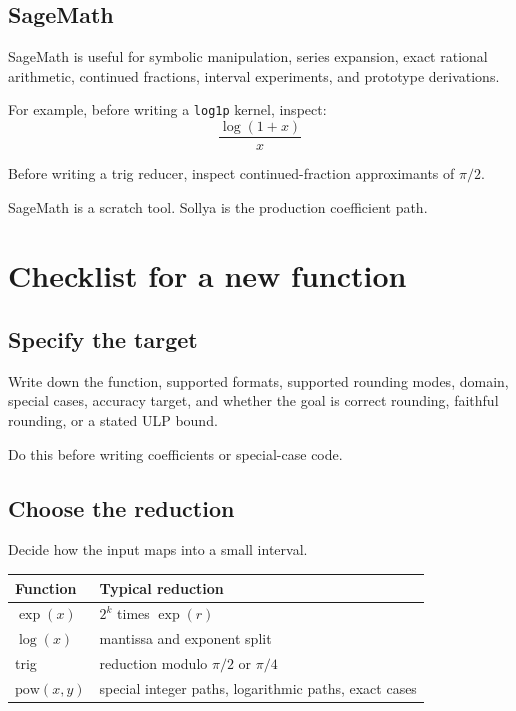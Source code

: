 \documentclass[manuscript, nonacm]{acmart}
\begin{document}
  \subsection{SageMath}

  SageMath is useful for symbolic manipulation, series expansion, exact rational
  arithmetic, continued fractions, interval experiments, and prototype
  derivations.

  For example, before writing a \texttt{log1p} kernel, inspect:
  \[ \frac{\log(1+x)}{x} \]

  Before writing a trig reducer, inspect continued-fraction approximants of
  $\pi/2$.

  SageMath is a scratch tool. Sollya is the production coefficient path.



  \section{Checklist for a new function}

  \subsection{Specify the target}

  Write down the function, supported formats, supported rounding modes, domain,
  special cases, accuracy target, and whether the goal is correct rounding,
  faithful rounding, or a stated ULP bound.

  Do this before writing coefficients or special-case code.

  \subsection{Choose the reduction}

  Decide how the input maps into a small interval.

  \begin{table}[tbp]
    \centering
    \begin{tabular}{ll}
      \toprule
      Function            & Typical reduction                                     \\
      \midrule
      $\exp(x)$           & $2^k$ times $\exp(r)$                                 \\
      $\log(x)$           & mantissa and exponent split                           \\
      trig                & reduction modulo $\pi/2$ or $\pi/4$                   \\
      $\mathrm{pow}(x,y)$ & special integer paths, logarithmic paths, exact cases \\
      \bottomrule
    \end{tabular}
  \end{table}
\end{document}
